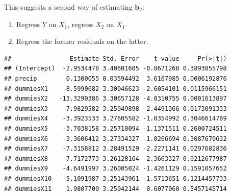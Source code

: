 \documentclass[
]{book}
\newenvironment{Shaded}{\begin{snugshade}}{\end{snugshade}}
\newcommand{\AttributeTok}[1]{\textcolor[rgb]{0.77,0.63,0.00}{#1}}
\newcommand{\DecValTok}[1]{\textcolor[rgb]{0.00,0.00,0.81}{#1}}
\newcommand{\FunctionTok}[1]{\textcolor[rgb]{0.00,0.00,0.00}{#1}}
\newcommand{\NormalTok}[1]{#1}
\newcommand{\OtherTok}[1]{\textcolor[rgb]{0.56,0.35,0.01}{#1}}
\newcommand{\SpecialCharTok}[1]{\textcolor[rgb]{0.00,0.00,0.00}{#1}}
\newcommand{\StringTok}[1]{\textcolor[rgb]{0.31,0.60,0.02}{#1}}
\providecommand{\tightlist}{%
  \setlength{\itemsep}{0pt}\setlength{\parskip}{0pt}}
\theoremstyle{definition}
\theoremstyle{definition}
\theoremstyle{definition}
\theoremstyle{definition}
\theoremstyle{remark}
\begin{document}
This suggests a second way of estimating \(\mathbf{b}_2\):

\begin{enumerate}
\def\labelenumi{\arabic{enumi}.}
\tightlist
\item
  Regress \(Y\) on \(X_1\), regress \(X_2\) on \(X_1\).
\item
  Regress the former residuals on the latter.
\end{enumerate}

\begin{Shaded}
\end{Shaded}

\begin{verbatim}
##                Estimate Std. Error    t value     Pr(>|t|)
## (Intercept)  -2.9534478 3.40601605 -0.8671268 0.3893855798
## precip        0.1300055 0.03594492  3.6167985 0.0006192876
## dummiesX1    -8.5990682 3.30046623 -2.6054101 0.0115966151
## dummiesX2   -13.3290386 3.30657128 -4.0310755 0.0001613897
## dummiesX3    -7.9829582 3.25949898 -2.4491366 0.0173091333
## dummiesX4    -3.3923533 3.27605582 -1.0354992 0.3046614769
## dummiesX5    -3.7038158 3.25710094 -1.1371511 0.2600724511
## dummiesX6    -3.3606412 3.27334327 -1.0266694 0.3087670632
## dummiesX7    -7.3158812 3.28491529 -2.2271141 0.0297682836
## dummiesX8    -7.7172773 3.26128164 -2.3663327 0.0212677987
## dummiesX9    -4.6491997 3.26005024 -1.4261129 0.1591057652
## dummiesX10   -5.1091987 3.25143961 -1.5713651 0.1214457733
## dummiesX11    1.9807700 3.25942144  0.6077060 0.5457145714
\end{verbatim}

\begin{Shaded}
\end{Shaded}
\end{document}
